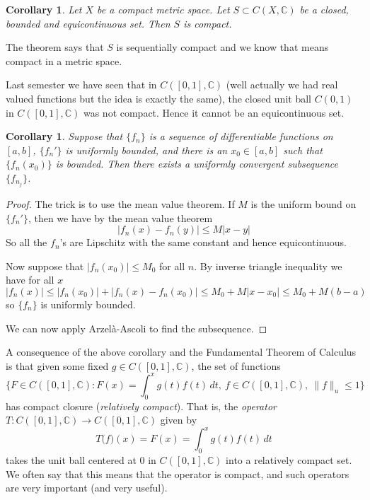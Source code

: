 \documentclass[12pt]{book}
\newcommand{\snorm}[1]{\lVert {#1} \rVert}
\newcommand{\abs}[1]{\left\lvert {#1} \right\rvert}
\newcommand{\C}{{\mathbb{C}}}
\theoremstyle{plain}
\newtheorem{cor}[thm]{Corollary}
\theoremstyle{remark}
\theoremstyle{definition}
\theoremstyle{exercise}
\theoremstyle{example}
\begin{document}
\begin{cor}
Let $X$ be a compact metric space.
Let $S \subset C(X,\C)$ be a closed, bounded and equicontinuous set.
Then $S$ is compact.
\end{cor}

The theorem says that $S$
is sequentially compact and we know that means
compact in a metric space.

Last semester we have seen that in $C([0,1],\C)$ (well actually we had real
valued functions but the idea is exactly the same), the closed unit ball
$C(0,1)$ in $C([0,1],\C)$ was not compact.  Hence it cannot be an
equicontinuous set.

\begin{cor}
Suppose that $\{ f_n \}$ is a sequence of differentiable functions on $[a,b]$,
$\{ f_n' \}$ is uniformly bounded, and there is an
$x_0 \in [a,b]$ such that $\{ f_n(x_0) \}$ is bounded.
Then there exists a uniformly convergent
subsequence $\{ f_{n_j} \}$.
\end{cor}

\begin{proof}
The trick is to use the mean value theorem.  If $M$ is the uniform bound on
$\{ f_n' \}$, then we have by the mean value theorem
\begin{equation*}
\abs{f_n(x)-f_n(y)} \leq M \abs{x-y}
\end{equation*}
So all the $f_n$'s are Lipschitz with the same constant and hence
equicontinuous.

Now suppose that $\abs{f_n(x_0)} \leq M_0$ for all $n$.
By inverse triangle inequality we have for all $x$
$$
\abs{f_n(x)} \leq \abs{f_n(x_0)}+ \abs{f_n(x)-f_n(x_0)} \leq M_0+ M \abs{x-x_0}
\leq M_0 + M(b-a)
$$
so $\{ f_n \}$ is uniformly bounded.

We can now apply Arzel\`a-Ascoli to find the subsequence.
\end{proof}

\medskip

A consequence of the above corollary and the Fundamental Theorem of Calculus
is that given some fixed $g \in
C([0,1],\C)$,
the set of functions
$$
\{ F \in C([0,1],\C) : F(x) = \int_0^x g(t) f(t)\,dt,~ f \in C([0,1],\C),~
\snorm{f}_u \leq 1 \}
$$
has compact closure (\emph{relatively compact}).
That is, the \emph{operator} $T \colon C([0,1],\C) \to C([0,1],\C)$ given by
$$
T\bigl(f\bigr) (x) = F(x) = \int_0^x g(t) f(t)\,dt
$$
takes the unit ball centered at 0 in $C([0,1],\C)$ into a relatively compact set.  We often
say that this means that the operator is compact, and such operators are very
important (and very useful).
\end{document}
